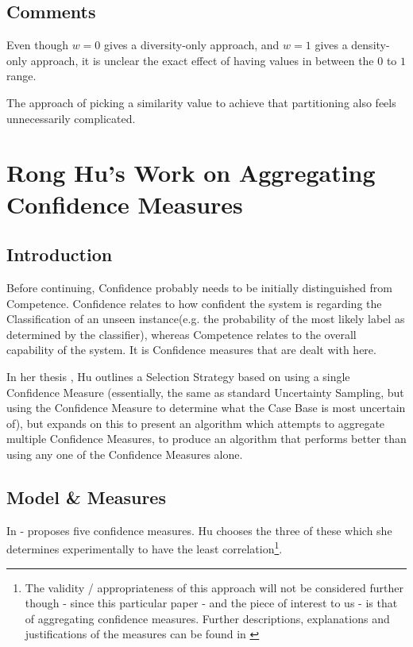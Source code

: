 \documentclass[a4paper,11pt]{report}
\begin{document}
\subsection{Comments}
Even though $w=0$ gives a diversity-only approach, and $w=1$ gives a density-only approach, it is unclear the exact effect of having values in between the $0$ to $1$ range.

The approach of picking a similarity value to achieve that partitioning also feels unnecessarily complicated.

\section{Rong Hu's Work on Aggregating Confidence Measures}
\subsection{Introduction}
Before continuing, Confidence probably needs to be initially distinguished from Competence. Confidence relates to how confident the system is regarding the Classification of an unseen instance(e.g. the probability of the most likely label as determined by the classifier), whereas Competence relates to the overall capability of the system. It is Confidence measures that are dealt with here.

In her thesis \citep{Hu2011}, Hu outlines a Selection Strategy based on using a single Confidence Measure (essentially, the same as standard Uncertainty Sampling, but using the Confidence Measure to determine what the Case Base is most uncertain of), but expands on this to present an algorithm which attempts to aggregate multiple Confidence Measures, to produce an algorithm that performs better than using any one of the Confidence Measures alone.

\subsection{Model \& Measures}

In \citep{Delany2005} - \citeauthor{Delany2005} proposes five confidence measures. Hu chooses the three of these which she determines experimentally to have the least correlation\footnote{The validity / appropriateness of this approach will not be considered further though - since this particular paper - and the piece of interest to us - is that of aggregating confidence measures. Further descriptions, explanations and justifications of the measures can be found in \citet{Delany2005}}.
\end{document}
